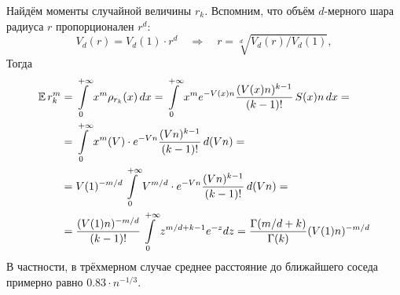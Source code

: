 Найдём моменты случайной величины $ r_k $.
Вспомним, что объём $ d $-мерного шара радиуса $ r $ пропорционален $ r^d $:
\[
    V_d(r) = V_d(1) \cdot r^d \quad \Longrightarrow \quad r = \sqrt[d]{V_d(r) / V_d(1)},
\]
Тогда
\begin{align}
    \label{eq:volume_distribution_models:kNN_distance_expectation}
    \operatorname{\mathbb{E}} r_k^m &= \int\limits_0^{+\infty} x^m \rho_{r_k}(x) \, dx =
    \int\limits_0^{+\infty} x^m e^{-V(x) n} \frac{(V(x) n)^{k-1}}{(k-1)!} \, S(x) n \, dx = \\
    &= \int\limits_0^{+\infty} x^m(V) \cdot e^{-V n} \frac{(V n)^{k-1}}{(k-1)!} \, d(V n) = \\
    &= V(1)^{-m/d} \int\limits_0^{+\infty} V^{m/d} \cdot e^{-V n} \frac{(V n)^{k-1}}{(k-1)!} \, d(V n) = \\
    &= \frac{(V(1) n)^{-m/d}}{(k-1)!} \int\limits_0^{+\infty} z^{m/d + k - 1} e^{-z} dz
    = \frac{\Gamma(m/d + k)}{\Gamma(k)} (V(1) n)^{-m/d}
\end{align}
В частности, в трёхмерном случае среднее расстояние до ближайшего соседа примерно равно $ 0.83 \cdot n^{-1/3} $.

